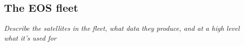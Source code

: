 



\subsection{The EOS fleet}

\textit{Describe the satellites in the fleet, what data they produce, and at a high level what it's used for}




